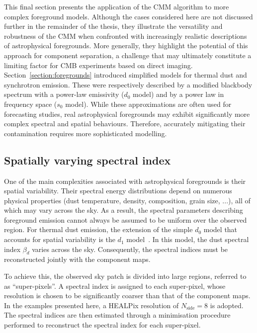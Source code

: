 \documentclass[../../thesis.tex]{subfiles}
\begin{document}
This final section presents the application of the CMM algorithm to more complex foreground models. Although the cases considered here are not discussed further in the remainder of the thesis, they illustrate the versatility and robustness of the CMM when confronted with increasingly realistic descriptions of astrophysical foregrounds. More generally, they highlight the potential of this approach for component separation, a challenge that may ultimately constitute a limiting factor for CMB experiments based on direct imaging.
Section~\ref{section:foregrounds} introduced simplified models for thermal dust and synchrotron emission. These were respectively described by a modified blackbody spectrum with a power-law emissivity ($d_0$ model) and by a power law in frequency space ($s_0$ model). While these approximations are often used for forecasting studies, real astrophysical foregrounds may exhibit significantly more complex spectral and spatial behaviours. Therefore, accurately mitigating their contamination requires more sophisticated modelling.

\subsection{Spatially varying spectral index} \label{sub:cmm_d1}

One of the main complexities associated with astrophysical foregrounds is their spatial variability. Their spectral energy distributions depend on numerous physical properties (dust temperature, density, composition, grain size, ...), all of which may vary across the sky. As a result, the spectral parameters describing foreground emission cannot always be assumed to be uniform over the observed region. For thermal dust emission, the extension of the simple $d_0$ model that accounts for spatial variability is the $d_1$ model~\cite{PySM}. In this model, the dust spectral index $\beta_d$ varies across the sky. Consequently, the spectral indices must be reconstructed jointly with the component maps.

To achieve this, the observed sky patch is divided into large regions, referred to as \enquote{super-pixels}. A spectral index is assigned to each super-pixel, whose resolution is chosen to be significantly coarser than that of the component maps. In the examples presented here, a HEALPix resolution of $N_{\mathrm{side}}=8$ is adopted. The spectral indices are then estimated through a minimisation procedure performed to reconstruct the spectral index for each super-pixel.
\end{document}
